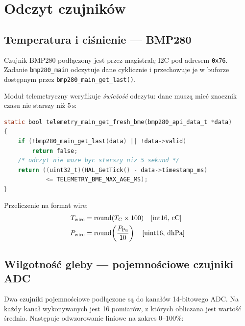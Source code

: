 \documentclass[12pt,a4paper]{article}
\newcommand{\qty}[2]{#1\,\ensuremath{#2}}
\newcommand{\si}[1]{\ensuremath{#1}}
\newcommand{\hecto}{\mathrm{h}}
\newcommand{\deci}{\mathrm{d}}
\newcommand{\centi}{\mathrm{c}}
\newcommand{\second}{\mathrm{s}}
\newcommand{\pascal}{\mathrm{Pa}}
\newcommand{\celsius}{\mathrm{C}}
\begin{document}
\section{Odczyt czujników}

\subsection{Temperatura i ciśnienie — BMP280}

Czujnik BMP280 podłączony jest przez magistralę I2C pod adresem \texttt{0x76}.
Zadanie \texttt{bmp280\_main} odczytuje dane cyklicznie i przechowuje je
w buforze dostępnym przez \texttt{bmp280\_main\_get\_last()}.

Moduł telemetryczny weryfikuje \emph{świeżość} odczytu: dane muszą mieć
znacznik czasu nie starszy niż \qty{5}{\second}:

\begin{lstlisting}[language=C, caption={Weryfikacja świeżości odczytu BMP280}]
static bool telemetry_main_get_fresh_bme(bmp280_api_data_t *data)
{
    if (!bmp280_main_get_last(data) || !data->valid)
        return false;
    /* odczyt nie moze byc starszy niz 5 sekund */
    return ((uint32_t)(HAL_GetTick() - data->timestamp_ms)
            <= TELEMETRY_BME_MAX_AGE_MS);
}
\end{lstlisting}

Przeliczenie na format wire:
\begin{align}
  T_{\text{wire}} &= \text{round}(T_{\text{C}} \times 100)
                     \quad \text{[int16, \si{\centi\celsius}]} \\
  P_{\text{wire}} &= \text{round}\!\left(\frac{P_{\text{Pa}}}{10}\right)
                     \quad \text{[uint16, \si{\deci\hecto\pascal}]}
\end{align}

\subsection{Wilgotność gleby — pojemnościowe czujniki ADC}

Dwa czujniki pojemnościowe podłączone są do kanałów 14-bitowego ADC.
Na każdy kanał wykonywanych jest 16 pomiarów, z których obliczana jest
wartość średnia. Następuje odwzorowanie liniowe na zakres 0–100\%:
\end{document}
